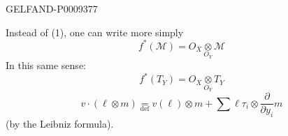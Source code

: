 \begin{GelfandAdjacentEvidence}{GELFAND-P000937}{7}


Instead of (1), one can write more simply
\begin{equation*}
 f^*(\mathcal M)=O_X\mathbin{\underset{O_Y}{\otimes}}\mathcal M
 \tag{4}
\end{equation*}
In this same sense:
\begin{equation*}
 f^*(T_Y)=O_X\mathbin{\underset{O_Y}{\otimes}}T_Y
 \tag{5}
\end{equation*}
\begin{equation*}
 v\cdot(\ell\otimes m)\underset{\mathrm{def}}{=}
 v(\ell)\otimes m+\sum\ell\tau_i\otimes\frac{\partial}{\partial y_i}m
 \tag{6}
\end{equation*}
(by the Leibniz formula).
\end{GelfandAdjacentEvidence}


